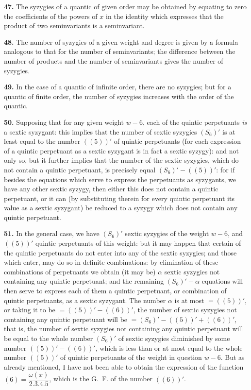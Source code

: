 \documentclass[12pt,a4paper]{article}
\theoremstyle{definition}
\begin{document}
\noindent\textbf{47.} The syzygies of a quantic of given order may be obtained by equating to zero the coefficients of the powers of $x$ in the identity which expresses that the product of two seminvariants is a seminvariant.

\noindent\textbf{48.} The number of syzygies of a given weight and degree is given by a formula analogous to that for the number of seminvariants; the difference between the number of products and the number of seminvariants gives the number of syzygies.

\noindent\textbf{49.} In the case of a quantic of infinite order, there are no syzygies; but for a quantic of finite order, the number of syzygies increases with the order of the quantic.

\noindent\textbf{50.} Supposing that for any given weight $w - 6$, each of the quintic perpetuants \textit{is} a sextic syzygant: this implies that the number of sextic syzygies $(S_6)'$ is at least equal to the number $((5))'$ of quintic perpetuants (for each expression of a quintic perpetuant as a sextic syzygant is in fact a sextic syzygy): and not only so, but it further implies that the number of the sextic syzygies, which do not contain a quintic perpetuant, is precisely equal $(S_6)' - ((5))'$: for if besides the equations which serve to express the perpetuants as syzygants, we have any other sextic syzygy, then either this does not contain a quintic perpetuant, or it can (by substituting therein for every quintic perpetuant its value as a sextic syzygant) be reduced to a syzygy which does not contain any quintic perpetuant.

\noindent\textbf{51.} In the general case, we have $(S_6)'$ sextic syzygies of the weight $w - 6$, and $((5))'$ quintic perpetuants of this weight: but it may happen that certain of the quintic perpetuants do not enter into any of the sextic syzygies; and those which enter, may do so in definite combinations: by elimination of these combinations of perpetuants we obtain (it may be) $\alpha$ sextic syzygies not containing any quintic perpetuant; and the remaining $(S_6)' - \alpha$ equations will then serve to express each of them a quintic perpetuant, or combination of quintic perpetuants, as a sextic syzygant. The number $\alpha$ is at most $= ((5))'$, or taking it to be $= ((5))' - ((6))'$, the number of sextic syzygies not containing any quintic perpetuant will be $= (S_6)' - ((5))' + ((6))'$, that is, the number of sextic syzygies not containing any quintic perpetuant will be equal to the whole number $(S_6)'$ of sextic syzygies diminished by some number $((5))' - ((6))'$, which is less than or at most equal to the whole number $((5))'$ of quintic perpetuants of the weight in question $w - 6$. But as already mentioned, I have not been able to obtain the expression of the function $(6) = \dfrac{\omega(x)}{2.3.4.5}$, which is the G.~F. of the number $((6))'$.
\end{document}
